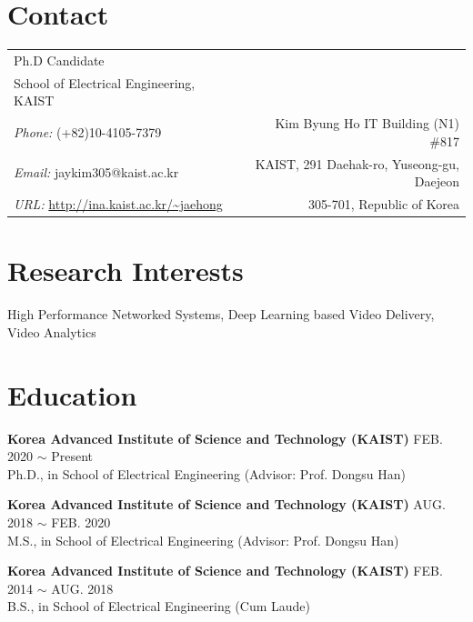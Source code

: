 \documentclass[margin,line,letter]{cv}
\begin{document}

\begin{resume}

\section{\sc Contact \\}
\begin{tabular}{@{} p{2.94in} r}
Ph.D Candidate\\
School of Electrical Engineering, KAIST \\
{\it Phone:} (+82)10-4105-7379 & Kim Byung Ho IT Building (N1) \#817 \\
{\it Email:} jaykim305@kaist.ac.kr & KAIST, 291 Daehak-ro, Yuseong-gu, Daejeon \\
{\it URL:} \url{http://ina.kaist.ac.kr/~jaehong} & 305-701, Republic of Korea \\
\end{tabular}

\section{\sc Research Interests \\}
High Performance Networked Systems, Deep Learning based Video Delivery, Video Analytics  \\

\section{\sc Education \\}

\textbf{Korea Advanced Institute of Science and Technology (KAIST)} \hfill \textsc{FEB.} 2020 $\sim$ Present \\
Ph.D., in School of Electrical Engineering (Advisor: Prof. Dongsu Han) \par 

\textbf{Korea Advanced Institute of Science and Technology (KAIST)} \hfill \textsc{AUG.} 2018 $\sim$ \textsc{FEB.} 2020 \\
M.S., in School of Electrical Engineering (Advisor: Prof. Dongsu Han) \par 

\textbf{Korea Advanced Institute of Science and Technology (KAIST)} \hfill \textsc{FEB.} 2014 $\sim$ \textsc{AUG.} 2018 \\
B.S., in School of Electrical Engineering  (Cum Laude) \par 


\end{resume}
\end{document}
